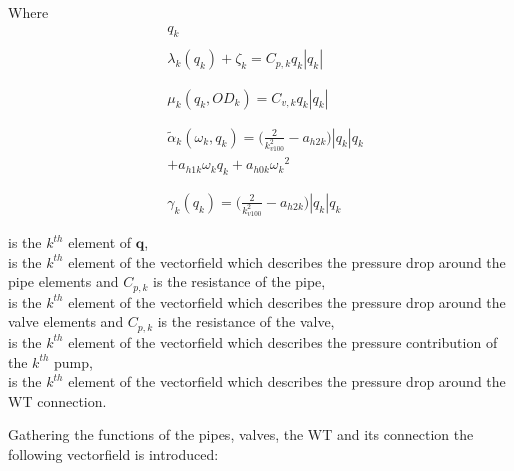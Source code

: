 \hspace{-0.1cm}
\begin{minipage}[t]{0.15\textwidth}
Where\\
\begin{align*}
&q_k \\[-13pt]\\ 
&\lambda_k (q_k) + \zeta_k= C_{p,k} q_k |q_k|\\\\
\\[8pt]&\mu_k (q_k,OD_k) = C_{v,k} q_k |q_k|  \\\\
\\[1pt]&\tilde{\alpha}_k(\omega_k,q_k) = \Big(\frac{2}{k_{v100}^2} - a_{h2k}\Big)|q_k| q_k \\& + a_{h1k} \omega_{k} q_k + a_{h0k}{\omega_k}^2  \\\\
\\[-30pt]&\gamma_k (q_k) = \Big(\frac{2}{k_{v100}^2} - a_{h2k}\Big)|q_k| q_k  
\end{align*}
\end{minipage}
\hspace{0.1cm}
\begin{minipage}[t]{0.5\textwidth}
 \vspace{1cm}is the $k^{th}$ element of $\bm{q}$, \vspace{5pt}\\
 is the $k^{th}$ element of the vectorfield which describes the pressure drop around the pipe elements and $C_{p,k}$ is the resistance of the pipe, \vspace{4pt} \\
 is the $k^{th}$ element of the vectorfield which describes the pressure drop around the valve elements and $C_{p,k}$ is the resistance of the valve,\vspace{4pt} \\
 is the $k^{th}$ element of the vectorfield which describes the pressure contribution of the $k^{th}$ pump,\vspace{10pt} \\
 is the $k^{th}$ element of the vectorfield which describes the pressure drop around the WT connection.  
\end{minipage}

Gathering the functions of the pipes, valves, the WT and its connection the following vectorfield is introduced:

